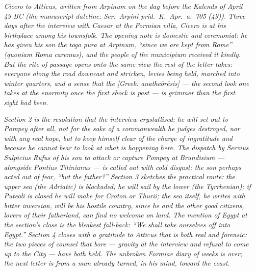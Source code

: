 
\textit{Cicero to Atticus, written from Arpinum on the
day before the Kalends of April 49 BC (the manuscript
dateline: \textit{Scr.\ Arpini prid.\ K.\ Apr.\ a.\ 705
(49)}). Three days after the interview with Caesar at
the Formian villa, Cicero is at his birthplace among
his townsfolk. The opening note is domestic and
ceremonial: he has given his son the \textit{toga pura}
at Arpinum, ``since we are kept from Rome''
(\textit{quoniam Roma caremus}), and the people of the
municipium received it kindly. But the rite of passage
opens onto the same view the rest of the letter takes:
everyone along the road downcast and stricken, levies
being held, marched into winter quarters, and a sense
that the \textit{[Greek: anathe\=or\=esis]} --- the
second look one takes at the enormity once the first
shock is past --- is grimmer than the first sight had
been.}

\textit{Section 2 is the resolution that the interview
crystallised: he will set out to Pompey after all, not
for the sake of a commonwealth he judges destroyed,
nor with any real hope, but to keep himself clear of
the charge of ingratitude and because he cannot bear to
look at what is happening here. The dispatch by Servius
Sulpicius Rufus of his son to attack or capture Pompey
at Brundisium --- alongside Pontius Titinianus --- is
called out with cold disgust: the son perhaps acted out
of fear, ``but the father?'' Section 3 sketches the
practical route: the upper sea (the Adriatic) is
blockaded; he will sail by the lower (the Tyrrhenian);
if Puteoli is closed he will make for Croton or Thurii;
the sea itself, he writes with bitter inversion, will
be his hostile country, since he and the other good
citizens, lovers of their fatherland, can find no
welcome on land. The mention of Egypt at the section's
close is the bleakest fall-back: ``We shall take
ourselves off into Egypt.'' Section 4 closes with a
gratitude to Atticus that is both real and forensic:
the two pieces of counsel that bore --- gravity at the
interview and refusal to come up to the City --- have
both held. The unbroken Formiae diary of weeks is over;
the next letter is from a man already turned, in his
mind, toward the coast.}
